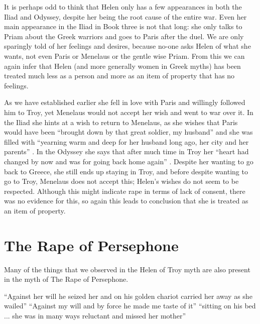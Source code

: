 \documentclass[11pt]{article}
\begin{document}
It is perhaps odd to think that Helen only has a few appearances in both the Iliad and Odyssey, despite her being the root cause of the entire war.
Even her main appearance in the Iliad in Book three is not that long: she only talks to Priam about the Greek warriors and goes to Paris after the duel.
We are only sparingly told of her feelings and desires, because no-one asks Helen of what she wants, not even Paris or Menelaus or the gentle wise Priam.
From this we can again infer that Helen (and more generally women in Greek myths) has been treated much less as a person and more as an item of property that has no feelings.

As we have established earlier she fell in love with Paris and willingly followed him to Troy, yet Menelaus would not accept her wish and went to war over it.
In the Iliad she hints at a wish to return to Menelaus, as she wishes that Paris would have been ``brought down by that great soldier, my husband'' and she was filled with ``yearning warm and deep for her husband long ago, her city and her parents'' \cite[book 1, line 500/168]{iliad}.
In the Odyssey she says that after much time in Troy her ``heart had changed by now and was for going back home again'' \cite[book 11, line 260]{odyssey}.
Despite her wanting to go back to Greece, she still ends up staying in Troy, and before despite wanting to go to Troy, Menelaus does not accept this; Helen's wishes do not seem to be respected.
Although this might indicate rape in terms of lack of consent, there was no evidence for this, so again this leads to conclusion that she is treated as an item of property.


\section{The Rape of Persephone}

Many of the things that we observed in the Helen of Troy myth are also present in the myth of The Rape of Persephone.

``Against her will he seized her and on his golden chariot carried her away as she wailed'' \cite[line 19]{persephone}
``Against my will and by force he made me taste of it'' \cite[line 412]{persephone}
``sitting on his bed ... she was in many ways reluctant and missed her mother'' \cite[line 344]{persephone}
\end{document}
